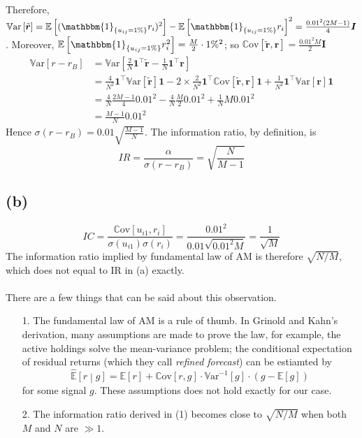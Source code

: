 \documentclass[11pt]{article}
\begin{document}
Therefore, $\mathrm{\mathbb{V}ar}\left[\tilde{\bm{r}}\right] = \mathbb{E}\left[(\mathbbm{1}_{\{u_{ij}=1\%\}}r_i)^2\right] - \mathbb{E}\left[\mathbbm{1}_{\{u_{ij}=1\%\}}r_i\right]^2 = \frac{0.01^2(2M-1)}{4} \bm{I}$. Moreover, $\mathbb{E}\left[\mathbbm{1}_{\{u_{ij}=1\%\}}r_i^2\right] = \frac{M}{2} \cdot 1\%^2$; so $\mathrm{\mathbb{C}ov}\left[\tilde{\bm{r}}, \bm{r}\right]=\frac{0.01^2M}{2} \bm{I}$
\begin{equation}
  \begin{split}
    \mathrm{\mathbb{V}ar}\left[r-r_B\right] &= \mathrm{\mathbb{V}ar}\left[\frac{2}{N}\bm{1}^{\top}\tilde{\bm{r}} - \frac{1}{N} \bm{1}^{\top} \bm{r}\right] \\
    &=\frac{4}{N^2} \bm{1}^{\top} \mathrm{\mathbb{V}ar}\left[\tilde{\bm{r}}\right] \bm{1} - 2\times\frac{2}{N^2}\bm{1}^{\top}\mathrm{\mathbb{C}ov}\left[\tilde{\bm{r}}, \bm{r}\right]\bm{1} + \frac{1}{N^2} \bm{1}^{\top} \mathrm{\mathbb{V}ar}\left[ \bm{r}\right]\bm{1} \\
    &= \frac{4}{N} \frac{2M-1}{4}0.01^2 - \frac{4}{N} \frac{M}{2}0.01^2 + \frac{1}{N} M0.01^2\\
    &= \frac{M-1}{N}0.01^2
  \end{split}
\end{equation}
Hence $\sigma(r-r_B) = 0.01\sqrt{\frac{M-1}{N}}$. The information ratio, by definition, is
\begin{equation}
  IR = \frac{\alpha}{\sigma(r-r_B)} = \sqrt{\frac{N}{M-1}}
\end{equation}

\subsection{(b)} 
\begin{equation}
  IC = \frac{\mathrm{\mathbb{C}ov}\left[u_{i1}, r_i\right]}{\sigma(u_{i1})\sigma(r_i)} = \frac{0.01^2}{0.01\sqrt{0.01^2M}} = \frac{1}{\sqrt{M}}
\end{equation}
The information ratio implied by fundamental law of AM is therefore $\sqrt{N/M}$, which does not equal to IR in (a) exactly. \\
~\\
There are a few things that can be said about this observation.
\begin{itemize}
  \item[1.] The fundamental law of AM is a rule of thumb. In Grinold and Kahn's derivation, many assumptions are made to prove the law, for example, the active holdings solve the mean-variance problem; the conditional expectation of residual returns (which they call \emph{refined forecast}) can be estiamted by
  $$
  \widehat{\mathbb{E}}\left[r\middle|g\right] = \mathbb{E}\left[r\right] + \mathrm{\mathbb{C}ov}\left[r, g\right] \cdot \mathrm{\mathbb{V}ar}^{-1}\left[g\right] \cdot (g - \mathbb{E}\left[g\right])
  $$
  for some signal $g$. These assumptions does not hold exactly for our case. 
  \item[2.] The information ratio derived in (1) becomes close to $\sqrt{N/M}$ when both $M$ and $N$ are $\gg 1$. 
\end{itemize}
\end{document}
